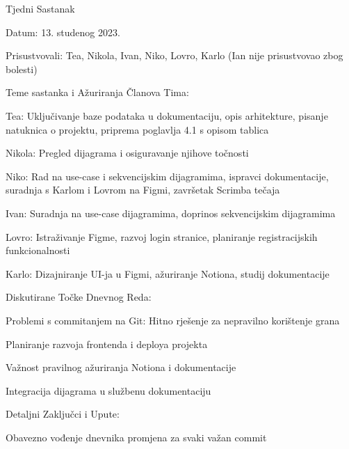 \begin{packed_enum}
\vspace{30pt}

\item Tjedni Sastanak 
    \item[] \begin{packed_item}
        \item Datum: 13. studenog 2023.
        \item Prisustvovali: Tea, Nikola, Ivan, Niko, Lovro, Karlo (Ian nije prisustvovao zbog bolesti)
        \item Teme sastanka i Ažuriranja Članova Tima:
            \begin{packed_item}
                \item Tea: Uključivanje baze podataka u dokumentaciju, opis arhitekture, pisanje natuknica o projektu, priprema poglavlja 4.1 s opisom tablica
                \item Nikola: Pregled dijagrama i osiguravanje njihove točnosti
                \item Niko: Rad na use-case i sekvencijskim dijagramima, ispravci dokumentacije, suradnja s Karlom i Lovrom na Figmi, završetak Scrimba tečaja
                \item Ivan: Suradnja na use-case dijagramima, doprinos sekvencijskim dijagramima
                \item Lovro: Istraživanje Figme, razvoj login stranice, planiranje registracijskih funkcionalnosti
                \item Karlo: Dizajniranje UI-ja u Figmi, ažuriranje Notiona, studij dokumentacije
            \end{packed_item}
        \item Diskutirane Točke Dnevnog Reda:
            \begin{packed_item}
                \item Problemi s commitanjem na Git: Hitno rješenje za nepravilno korištenje grana
                \item Planiranje razvoja frontenda i deploya projekta
                \item Važnost pravilnog ažuriranja Notiona i dokumentacije
                \item Integracija dijagrama u službenu dokumentaciju
            \end{packed_item}
        \item Detaljni Zaključci i Upute:
            \begin{packed_item}
                \item Obavezno vođenje dnevnika promjena za svaki važan commit

\end{packed_item}
\end{packed_item}
\end{packed_enum}
